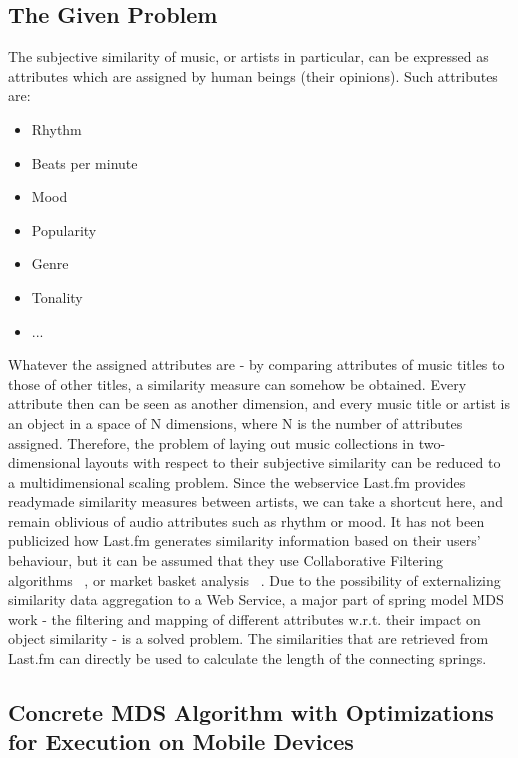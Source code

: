 \subsection{The Given Problem}

The subjective similarity of music, or artists in particular, can be expressed as attributes which are assigned by human beings (their opinions). Such attributes are:

\begin{itemize}
	\item Rhythm
	\item Beats per minute
	\item Mood
	\item Popularity
	\item Genre
	\item Tonality
	\item ...
\end{itemize}

Whatever the assigned attributes are - by comparing attributes of music titles to those of other titles, a similarity measure can somehow be obtained. Every attribute then can be seen as another dimension, and every music title or artist is an object in a space of N dimensions, where N is the number of attributes assigned. Therefore, the problem of laying out music collections in two-dimensional layouts with respect to their subjective similarity can be reduced to a multidimensional scaling problem.
Since the webservice Last.fm provides readymade similarity measures between artists, we can take a shortcut here, and remain oblivious of audio attributes such as rhythm or mood. It has not been publicized how Last.fm generates similarity information based on their users' behaviour, but it can be assumed that they use Collaborative Filtering algorithms ~\cite{Takacs:2007}, or market basket analysis ~\cite{Aggarwal99anew}. Due to the possibility of externalizing similarity data aggregation to a Web Service, a major part of spring model MDS work - the filtering and mapping of different attributes w.r.t. their impact on object similarity - is a solved problem. The similarities that are retrieved from Last.fm can directly be used to calculate the length of the connecting springs.

\subsection{Concrete MDS Algorithm with Optimizations for Execution on Mobile Devices}

